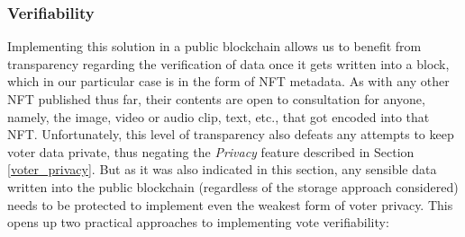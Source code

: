 \documentclass[../main.tex]{subfiles}
\begin{document}
\subsubsection{Verifiability}
\label{verifiability}
Implementing this solution in a public blockchain allows us to benefit from transparency regarding the verification of data once it gets written into a block, which in our particular case is in the form of NFT metadata. As with any other NFT published thus far, their contents are open to consultation for anyone, namely, the image, video or audio clip, text, etc., that got encoded into that NFT. Unfortunately, this level of transparency also defeats any attempts to keep voter data private, thus negating the \textit{Privacy} feature described in Section \ref{voter_privacy}. But as it was also indicated in this section, any sensible data written into the public blockchain (regardless of the storage approach considered) needs to be protected to implement even the weakest form of voter privacy. This opens up two practical approaches to implementing vote verifiability:
\end{document}
